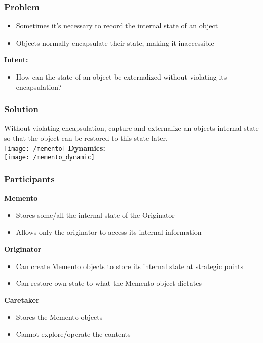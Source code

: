 \subsubsection{Problem}
\begin{itemize}[topsep=0pt]
    \itemsep -0.4em
    \item Sometimes it's necessary to record the internal state of an object
    \item Objects normally encapsulate their state, making it inaccessible
\end{itemize}
\textbf{Intent:}
\begin{itemize}[topsep=0pt]
    \itemsep -0.4em
    \item How can the state of an object be externalized without violating its encapsulation?
\end{itemize}
\subsubsection{Solution}
Without violating encapsulation, capture and externalize an objects internal state so that the object can be restored to this state later.\\
\texttt{[image: /memento]}
\textbf{Dynamics:}\\ 
\texttt{[image: /memento\_dynamic]}

\subsubsection{Participants}
\textbf{Memento}
\begin{itemize}[topsep=0pt]
    \itemsep -0.4em
    \item Stores some/all the internal state of the Originator
    \item Allows only the originator to access its internal information
\end{itemize}
\textbf{Originator}
\begin{itemize}[topsep=0pt]
    \itemsep -0.4em
    \item Can create Memento objects to store its internal state at strategic points
    \item Can restore own state to what the Memento object dictates
\end{itemize}
\textbf{Caretaker}
\begin{itemize}[topsep=0pt]
    \itemsep -0.4em
    \item Stores the Memento objects
    \item Cannot explore/operate the contents
\end{itemize}

